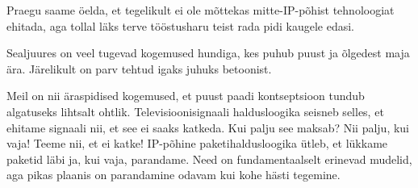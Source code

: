 Praegu saame öelda, et tegelikult ei ole mõttekas mitte-IP-põhist 
tehnoloogiat ehitada, aga tollal läks terve tööstusharu teist rada pidi kaugele 
edasi.


Sealjuures on veel tugevad kogemused hundiga, kes puhub puust ja õlgedest 
maja ära. Järelikult on parv tehtud igaks juhuks betoonist. 

Meil on nii äraspidised kogemused, et puust paadi kontseptsioon 
tundub algatuseks lihtsalt ohtlik. Televisioonisignaali haldusloogika seisneb selles, et ehitame 
signaali nii, et see ei saaks katkeda. Kui palju see maksab? Nii palju, kui vaja! Teeme 
nii, et ei katke! IP-põhine paketihaldusloogika ütleb, et lükkame paketid läbi ja, kui vaja, parandame. Need on 
fundamentaalselt erinevad mudelid, aga pikas plaanis on parandamine 
odavam kui kohe hästi tegemine.
